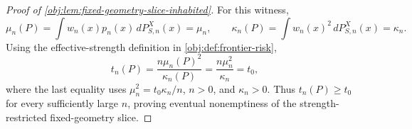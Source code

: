 \begin{proof}[Proof of \cref{obj:lem:fixed-geometry-slice-inhabited}]
For this witness,
\[
\mu_n(P)=\int w_n(x)p_n(x)\,dP_{S,n}^X(x)=\mu_n,
\qquad
\kappa_n(P)=\int w_n(x)^2\,dP_{S,n}^X(x)=\kappa_n.
\]
Using the effective-strength definition in \cref{obj:def:frontier-risk},
\[
t_n(P)
=
\frac{n\mu_n(P)^2}{\kappa_n(P)}
=
\frac{n\mu_n^2}{\kappa_n}
=
t_0,
\]
where the last equality uses \(\mu_n^2=t_0\kappa_n/n\), \(n>0\), and \(\kappa_n>0\). Thus \(t_n(P)\ge t_0\) for every sufficiently large \(n\), proving eventual nonemptiness of the strength-restricted fixed-geometry slice. %
\end{proof}
